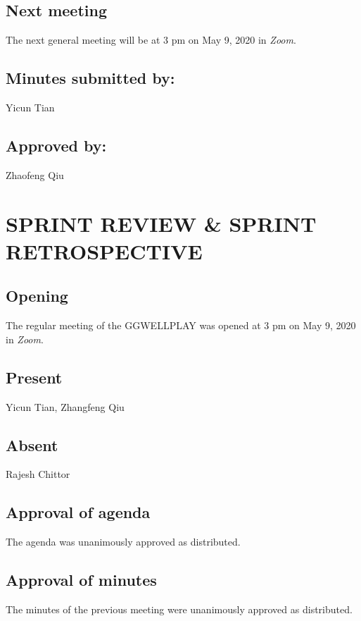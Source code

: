 \subsection*{Next meeting}
The next general meeting will be at 3 pm on May 9, 2020 in \textit{Zoom}.

\subsection*{Minutes submitted by:} 
Yicun Tian

\subsection*{Approved by:} 
Zhaofeng Qiu

\clearpage
\section*{SPRINT REVIEW \& SPRINT RETROSPECTIVE
}
\subsection*{Opening}
The regular meeting of the GGWELLPLAY was opened at 3 pm on May 9, 2020 in \textit{Zoom}.

\subsection*{Present}
Yicun Tian, Zhangfeng Qiu

\subsection*{Absent}
Rajesh Chittor

\subsection*{Approval of agenda}
The agenda was unanimously approved as distributed.

\subsection*{Approval of minutes}
The minutes of the previous meeting were unanimously approved as distributed.

